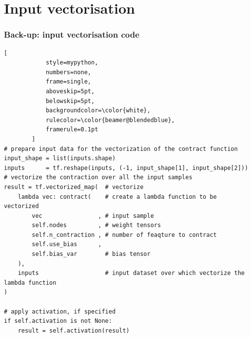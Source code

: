 \documentclass[xcolor=table,8pt]{beamer}
\begin{document}
    \section{Input vectorisation}
    \begin{frame}[t, fragile]
        \frametitle{Back-up: input vectorisation code}
        \begin{lstlisting}[
            style=mypython,
            numbers=none,
            frame=single,
            aboveskip=5pt,
            belowskip=5pt,
            backgroundcolor=\color{white},
            rulecolor=\color{beamer@blendedblue},
            framerule=0.1pt
        ]
# prepare input data for the vectorization of the contract function
input_shape = list(inputs.shape)
inputs      = tf.reshape(inputs, (-1, input_shape[1], input_shape[2]))
# vectorize the contraction over all the input samples
result = tf.vectorized_map(  # vectorize
	lambda vec: contract(    # create a lambda function to be vectorized
		vec                , # input sample
		self.nodes         , # weight tensors
		self.n_contraction , # number of feaqture to contract
		self.use_bias      , 
		self.bias_var		 # bias tensor
	), 
	inputs					 # input dataset over which vectorize the lambda function
)

# apply activation, if specified
if self.activation is not None:
    result = self.activation(result)
        \end{lstlisting}
    \end{frame}

    
\end{document}
